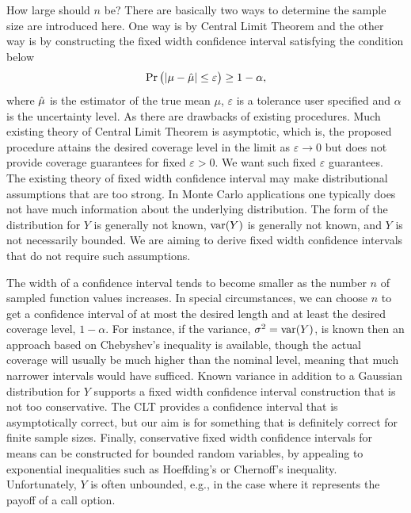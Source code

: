 \documentclass{iitthesis}
\theoremstyle{definition}
\begin{document}

How large should $n$ be? There are basically two ways to determine the sample size are introduced here. One way is by Central Limit Theorem and the other way is by constructing the fixed width confidence interval satisfying the condition below
\begin{align}
\Pr \left(\left \lvert \mu-\hat{\mu} \right \rvert \leq \varepsilon \right) \geq 1-\alpha,
\end{align}
where $\hat{\mu}$ is the estimator of the true mean $\mu$, $\varepsilon$ is a tolerance user specified and $\alpha$ is the uncertainty level.
As there are drawbacks of existing procedures.  Much existing theory of Central Limit Theorem is asymptotic, which is, the proposed procedure attains the desired coverage level in the limit as $\varepsilon\to 0$ but does not provide coverage guarantees for fixed $\varepsilon>0$.  We want such fixed $\varepsilon$ guarantees.  The existing theory of fixed width confidence interval may make distributional assumptions that are too strong.  In Monte Carlo applications one typically does not have much information about the underlying distribution. The form of the distribution for $Y$ is generally not known, $\operatorname{var}(Y)$ is generally not known, and $Y$ is not necessarily bounded. We are aiming to derive fixed width confidence intervals that do not require such assumptions.  

The width of a confidence interval tends to become smaller as the number $n$ of sampled
function values increases. In special circumstances, we can choose $n$ to get a confidence interval of at most the desired length and at least the desired coverage level, $1-\alpha$. For instance, if the variance, $\sigma^2=\operatorname{var}(Y)$, is known then an approach based on Chebyshev's inequality is available, though the actual coverage will usually be much higher than the nominal level, meaning that much narrower intervals would have sufficed. Known variance in addition to a Gaussian distribution for $Y$ supports a fixed width confidence interval construction that is not too conservative. The CLT provides a confidence interval that is asymptotically correct, but our aim is for something that is definitely correct for finite sample sizes. Finally, conservative fixed width confidence intervals for means can be constructed for bounded random variables, by appealing to exponential inequalities such as Hoeffding's or Chernoff's inequality.  Unfortunately, $Y$ is often unbounded, e.g., in the case where it represents the payoff of a call option.
\end{document}
